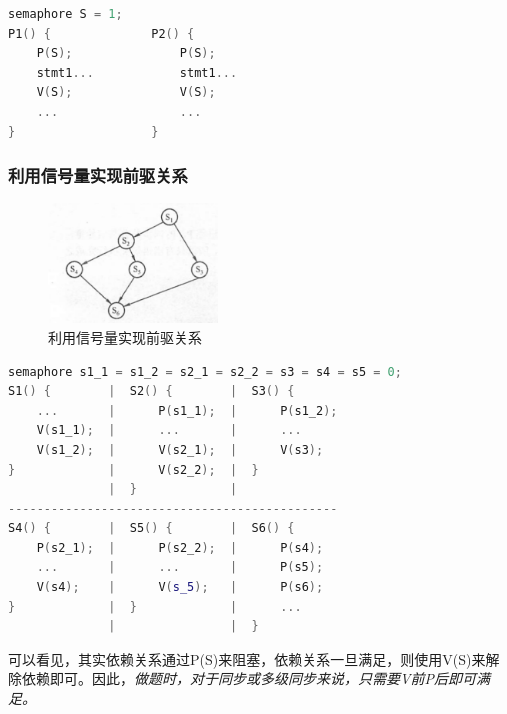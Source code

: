 \begin{lstlisting}[language=C++]
semaphore S = 1;
P1() {              P2() {
    P(S);               P(S);
    stmt1...            stmt1...
    V(S);               V(S);
    ...                 ...
}                   }
\end{lstlisting}

\subsubsection{利用信号量实现前驱关系}

\begin{figure}[!htbp]
    \centering
    \includegraphics[width=0.4\textwidth]{image/chapter02/利用信号量实现前驱.png}
    \caption{利用信号量实现前驱关系}
\end{figure}

\begin{lstlisting}[language=C++]
semaphore s1_1 = s1_2 = s2_1 = s2_2 = s3 = s4 = s5 = 0;
S1() {        |  S2() {        |  S3() {
    ...       |      P(s1_1);  |      P(s1_2);
    V(s1_1);  |      ...       |      ...
    V(s1_2);  |      V(s2_1);  |      V(s3);
}             |      V(s2_2);  |  }
              |  }             |
----------------------------------------------
S4() {        |  S5() {        |  S6() {
    P(s2_1);  |      P(s2_2);  |      P(s4);
    ...       |      ...       |      P(s5);
    V(s4);    |      V(s_5);   |      P(s6);
}             |  }             |      ...
              |                |  }
\end{lstlisting}

    可以看见，其实依赖关系通过P(S)来阻塞，依赖关系一旦满足，则使用V(S)来解除依赖即可。因此，\emph{做题时，对于同步或多级同步来说，只需要V前P后即可满足。}

